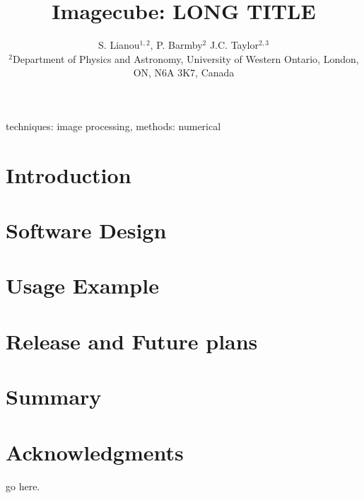 \documentclass[useAMS,usenatbib]{mn2e}
\title[Imagecube]{Imagecube: LONG TITLE}
\author[Lianou, Barmby, Taylor]
{
S. Lianou$^{1,2}$,
P. Barmby$^{2}$
J.C. Taylor$^{2,3}$\\
$^{2}$Department of Physics and Astronomy, University of Western Ontario, London, ON, N6A 3K7, Canada\\
}
\begin{document}
\date{}


\maketitle

\label{firstpage}

\begin{abstract}

\end{abstract}

\begin{keywords}
techniques: image processing, methods: numerical
\end{keywords}

\section{Introduction}


\section{Software Design}


\section{Usage Example}


\section{Release and Future plans}


\section{Summary}



\section*{Acknowledgments}

go here.


{}

\bsp


\appendix

\label{lastpage}
\end{document}
